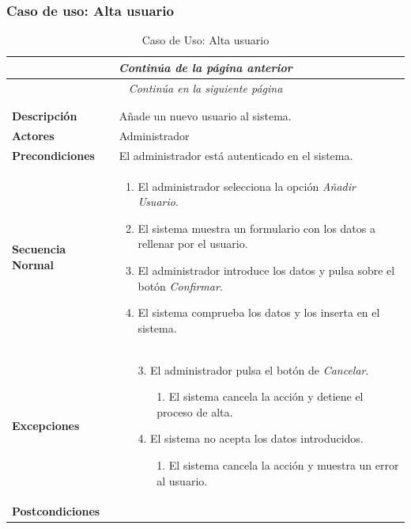 \subsubsection*{Caso de uso: Alta usuario }
\begin{longtable}{| p{4cm} | p{10cm} |}
\endfirsthead
\multicolumn{2}{c}{\textit{Continúa de la página anterior}}\\[12pt]
\hline
\endhead
\hline
\multicolumn{2}{c}{\textit{Continúa en la siguiente página}} \\
\endfoot
\hline
\caption{Caso de Uso: Alta usuario}\label{fig:1}\\
\endlastfoot


\hline
\multicolumn{2}{|c|}{\textbf{CU$<$23$>$ - Alta Usuario}} \\

\hline
\textbf{Descripción} &
Añade un nuevo usuario al sistema.\\

\hline
\textbf{Actores} &
Administrador\\

\hline
\textbf{Precondiciones} &
El administrador está autenticado en el sistema.\\

\hline
\textbf{Secuencia Normal} &\mbox{}\par\vspace{-\baselineskip}
\begin{enumerate}[leftmargin=0.7cm, topsep=0.1cm]
\item El administrador selecciona la opción \textit{Añadir Usuario}.
\item El sistema muestra un formulario con los datos a rellenar por el usuario.
\item El administrador introduce los datos y pulsa sobre el botón \textit{Confirmar}.
\item El sistema comprueba los datos y los inserta en el sistema.
\end{enumerate}


\\
\hline
\textbf{Excepciones} &\mbox{}\par\vspace{-\baselineskip}
\begin{enumerate}[leftmargin=0.9cm, topsep=0.1cm]
\item[3.] El administrador pulsa el botón de \textit{Cancelar}.
	\begin{itemize}
	\item[1.] El sistema cancela la acción y detiene el proceso de alta.
	\end{itemize}
\item[4.] El sistema no acepta los datos introducidos.
	\begin{itemize}
	\item[1.] El sistema cancela la acción y muestra un error al usuario.
	\end{itemize}
\end{enumerate}
\\

\hline
\textbf{Postcondiciones} & \\
\hline
\end{longtable}



